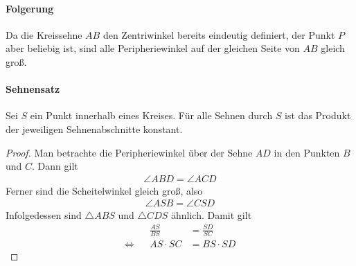 \documentclass[11pt]{article}
\begin{document}
\paragraph{Folgerung} Da die Kreissehne $ AB $ den Zentriwinkel bereits eindeutig definiert, der Punkt $ P $ aber beliebig ist, sind alle Peripheriewinkel auf der gleichen Seite von $ AB $ gleich groß.
\paragraph{Sehnensatz} Sei $ S $ ein Punkt innerhalb eines Kreises. Für alle Sehnen durch $ S $ ist das Produkt der jeweiligen Sehnenabschnitte konstant.
\begin{center}
\end{center}
\begin{proof}
	Man betrachte die Peripheriewinkel über der Sehne $ AD $ in den Punkten $ B $ und $ C $. Dann gilt
	\begin{equation*}
	\begin{aligned}
	\angle ABD = \angle ACD
	\end{aligned}
	\end{equation*}
	Ferner sind die Scheitelwinkel gleich groß, also
	\begin{equation*}
	\begin{aligned}
	\angle ASB = \angle CSD
	\end{aligned}
	\end{equation*}
	Infolgedessen sind $ \triangle ABS $ und $ \triangle CDS $ ähnlich. Damit gilt
	\begin{equation*}
	\begin{aligned}
	&& \frac{AS}{BS} &= \frac{SD}{SC}\\
	\Leftrightarrow && AS \cdot SC &= BS \cdot SD
	\end{aligned}
	\end{equation*}
\end{proof}
\end{document}
